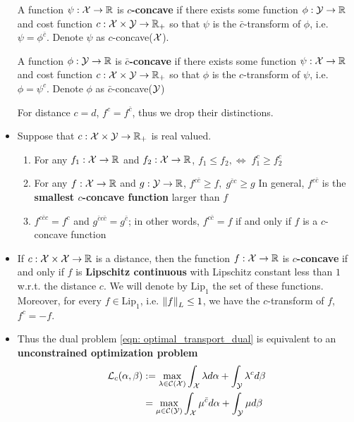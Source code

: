 \documentclass[11pt]{article}
\begin{document}
\begin{itemize}
A function $\psi: {\mathcal X} \rightarrow {\mathbb R}$ is \textbf{$c$-concave} if there exists some function $\phi: {\mathcal Y} \rightarrow {\mathbb R}$ and cost function $c: {\mathcal X} \times {\mathcal Y} \rightarrow {\mathbb R}_{+}$ so that $\psi$ is the $\bar{c}$-transform of $\phi$, i.e. 
$\psi = \phi^{\bar{c}}$. Denote $\psi$ as $c$-concave(${\mathcal X}$).

A function $\phi: {\mathcal Y} \rightarrow {\mathbb R}$ is \textbf{$\bar{c}$-concave} if there exists some function $\psi: {\mathcal X} \rightarrow {\mathbb R}$ and cost function $c: {\mathcal X} \times {\mathcal Y} \rightarrow {\mathbb R}_{+}$ so that $\phi$ is the $c$-transform of $\psi$, i.e. 
$\phi = \psi^{c}$. Denote $\phi$ as $\bar{c}$-concave(${\mathcal Y}$)

For distance $c=d$, $f^{c} = f^{\bar{c}}$, thus we drop their distinctions.

\item Suppose that $c: {\mathcal X} \times {\mathcal Y} \rightarrow {\mathbb R}_{+}$ is real valued. 
\begin{enumerate}
\item For any $f_1: {\mathcal X} \rightarrow {\mathbb R}$ and $f_2: {\mathcal X} \rightarrow {\mathbb R}$, $f_{1} \le f_{2},\Leftrightarrow\;    f_{1}^{c} \ge f_{2}^{c}$
\item For any $f: {\mathcal X} \rightarrow {\mathbb R}$ and $g: {\mathcal Y} \rightarrow {\mathbb R}$, $f^{c\bar{c}} \ge f, \;  g^{\bar{c}c} \ge g$ In general, $f^{c\bar{c}}$ is the \textbf{smallest $c$-concave function} larger than $f$
\item $f^{c\bar{c}c} =  f^{c}$ and $g^{\bar{c}c\bar{c}} =  g^{\bar{c}}$; in other words, $f^{c\bar{c}} = f$ if and only if $f$ is a $c$-concave function
\end{enumerate}


\item 
\begin{proposition}
If $c: {\mathcal X} \times {\mathcal X}\rightarrow {\mathbb R}$ is a distance, then the function $f: {\mathcal X} \rightarrow {\mathbb R}$ is \textbf{$c$-concave} if and only if $f$ is \textbf{Lipschitz continuous} with Lipschitz constant less than $1$ w.r.t. the distance $c$.  We will denote by $\text{Lip}_1$ the set of these functions. Moreover, for every $f \in \text{Lip}_1$, i.e. $\left\|f\right\|_{L} \le 1$, we have the $c$-transform of $f$, $f^{c} = -f$. \citep{santambrogio2015optimal}
\end{proposition}

\item Thus the dual problem \eqref{eqn: optimal_transport_dual} is equivalent to an \textbf{unconstrained optimization problem}
\begin{align}
{\mathcal L}_{c}(\alpha, \beta)&:= \max_{\lambda \in {\mathcal C}({\mathcal X})} \int_{{\mathcal X}}\lambda d\alpha + \int_{{\mathcal Y}} \lambda^{c} d\beta   \label{eqn: optimal_transport_dual_c_transform_prob} \\
&= \max_{\mu \in  {\mathcal C}({\mathcal Y})} \int_{{\mathcal X}}\mu^{\bar{c}} d\alpha + \int_{{\mathcal Y}} \mu d\beta  \label{eqn: optimal_transport_dual_c_concave_prob}
\end{align}
\end{itemize}
\end{document}
